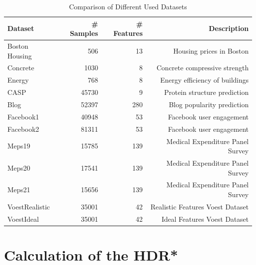 \begin{table}
    \caption{Comparison of Different Used Datasets}\label{tab:dataset_overview}
    \centering
    \begin{tabular}{lrrr}
        \toprule
        Dataset        & \# Samples & \# Features & Description                      \\
        \midrule
        Boston Housing & 506        & 13          & Housing prices in Boston         \\
        Concrete       & 1030       & 8           & Concrete compressive strength    \\
        Energy         & 768        & 8           & Energy efficiency of buildings   \\
        CASP           & 45730      & 9           & Protein structure prediction     \\
        Blog           & 52397      & 280         & Blog popularity prediction       \\
        Facebook1      & 40948      & 53          & Facebook user engagement         \\
        Facebook2      & 81311      & 53          & Facebook user engagement         \\
        Meps19         & 15785      & 139         & Medical Expenditure Panel Survey \\
        Meps20         & 17541      & 139         & Medical Expenditure Panel Survey \\
        Meps21         & 15656      & 139         & Medical Expenditure Panel Survey \\
        VoestRealistic & 35001      & 42          & Realistic Features Voest Dataset \\
        VoestIdeal     & 35001      & 42          & Ideal Features Voest Dataset     \\
        \bottomrule
    \end{tabular}
\end{table}

\section{Calculation of the HDR*}

